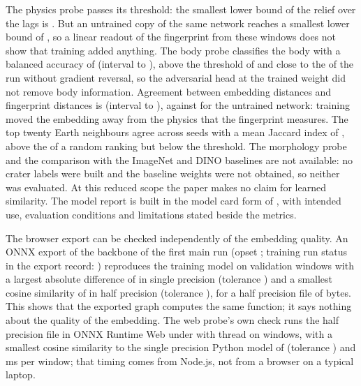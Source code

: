 The physics probe passes its threshold: the smallest lower bound of the relief \Rsq{} over the lags is \EncoderPhysRReliefMin. But an untrained copy of the same network reaches a smallest lower bound of \RandomPhysRReliefMin, so a linear readout of the fingerprint from these windows does not show that training added anything. The body probe classifies the body with a balanced accuracy of \EncoderBodyAcc{} (interval \EncoderBodyAccLow{} to \EncoderBodyAccHigh), above the threshold of \GFiveBodyAccMax{} and close to the \NoAdvBodyAcc{} of the run without gradient reversal, so the adversarial head at the trained weight did not remove body information. Agreement between embedding distances and fingerprint distances is \EncoderAgreementRho{} (interval \EncoderAgreementLow{} to \EncoderAgreementHigh), against \RandomAgreementRho{} for the untrained network: training moved the embedding away from the physics that the fingerprint measures. The top twenty Earth neighbours agree across seeds with a mean Jaccard index of \EncoderSeedJaccard, above the \RandomSeedJaccard{} of a random ranking but below the threshold. The morphology probe and the comparison with the ImageNet and DINO baselines are not available: no crater labels were built and the baseline weights were not obtained, so neither was evaluated. At this reduced scope the paper makes no claim for learned similarity. The model report is built in the model card form of \citet{mitchell2019}, with intended use, evaluation conditions and limitations stated beside the metrics.

The browser export can be checked independently of the embedding quality. An ONNX export of the backbone of the first main run (opset \OnnxOpset; training run status in the export record: \OnnxSourceStatus) reproduces the training model on \OnnxParityN{} validation windows with a largest absolute difference of \OnnxFpDiff{} in single precision (tolerance \OnnxFpThreshold) and a smallest cosine similarity of \OnnxHalfCosine{} in half precision (tolerance \OnnxHalfThreshold), for a half precision file of \OnnxHalfBytes{} bytes. This shows that the exported graph computes the same function; it says nothing about the quality of the embedding. The web probe's own check runs the half precision file in ONNX Runtime Web \WasmOrtVersion{} under \WasmRuntime{} with \WasmThreads{} thread on \WasmWindows{} windows, with a smallest cosine similarity to the single precision Python model of \WasmMinCosine{} (tolerance \WasmThreshold) and \WasmMs{} ms per window; that timing comes from Node.js, not from a browser on a typical laptop.

